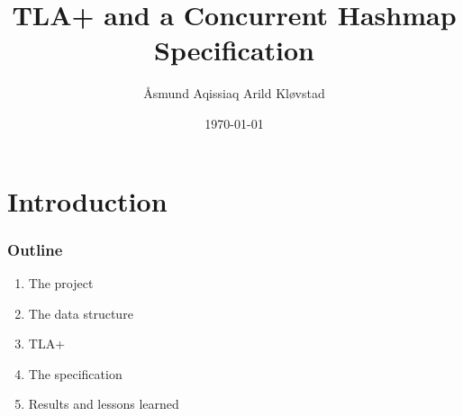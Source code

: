 \documentclass{beamer}
\title[]{TLA+ and a Concurrent Hashmap Specification} %
\author{Åsmund Aqissiaq Arild Kløvstad} %
\institute[UiB] %
{
Universitetet i Bergen \\ %
}
\date{\today} %
\begin{document}
\begin{frame}
\titlepage %
\end{frame}





\section{Introduction}


\begin{frame}
  \frametitle{Outline}
  \begin{enumerate}
  \item The project
  \item The data structure
  \item TLA+
  \item The specification
  \item Results and lessons learned
  \end{enumerate}
\end{frame}
\end{document}

